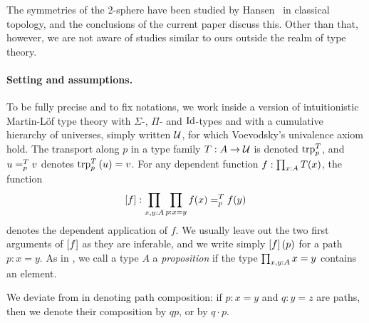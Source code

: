 \documentclass[english,a4paper]{lmcs}
\begin{document}
The symmetries of the 2-sphere have been studied by Hansen~\cite{hansen} in classical topology, and the conclusions of the current paper discuss this.
Other than that, however, we are not aware of studies similar to ours outside the realm of type theory.


\paragraph{Setting and assumptions.}
To be fully precise and to fix notations, we work inside a version of
intuitionistic Martin-L\"of type theory with $\Sigma$-, $\Pi$- and
$\Id$-types and with a cumulative hierarchy of universes,
simply written $\UU$, for which Voevodsky's univalence axiom hold. The
transport along $p$ in a type family $T:A\to \UU$ is denoted
$\trp [T] p$, and $\pathover u T p v$ denotes $\trp [T] p {(u)} = v$.
For any dependent function $f\from\prod_{x\from A}T(x)$,
the function
\begin{displaymath}
  \ap f:\prod_{x,y\from A}\prod_{p\from x=y} \pathover {f(x)} T p
  {f(y)}
\end{displaymath}
denotes the dependent application of $f$. We usually leave out the two
first arguments of $\ap f$ as they are inferable, and we write simply
$\ap f (p)$ for a path $p:x=y$. As in \cite{HoTT}, we call a type $A$
a \emph{proposition} if the type $\prod_{x,y\from A} x=y$ contains an
element.

We deviate from \cite{HoTT} in denoting path composition:
if $p:x=y$ and $q:y=z$ are paths, then we denote their
composition by $qp$, or by $q\cdot p$.
\end{document}
